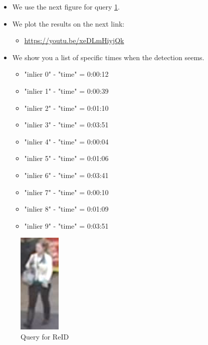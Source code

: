 \documentclass[a4paper]{article}
\begin{document}
\begin{itemize}

\item We use the next figure for query \ref{fig:query_id_92}.
\item  We plot the results on the next link: 
\begin{itemize}
    \item \href{https://youtu.be/xeDLmHiyjQk}{https://youtu.be/xeDLmHiyjQk}
\end{itemize}
\item  We show you a list of specific times when the detection seems.
    \begin{itemize}
        \item "inlier 0" - "time" = 0:00:12
        \item "inlier 1" - "time" = 0:00:39
        \item "inlier 2" - "time" = 0:01:10
        \item "inlier 3" - "time" = 0:03:51
        \item "inlier 4" - "time" = 0:00:04
        \item "inlier 5" - "time" = 0:01:06
        \item "inlier 6" - "time" = 0:03:41
        \item "inlier 7" - "time" = 0:00:10
        \item "inlier 8" - "time" = 0:01:09
        \item "inlier 9" - "time" = 0:03:51
    \end{itemize}

\end{itemize}

\begin{figure}[ht]
    \centering
    \includegraphics[width=2cm]{imgs/query_id_92.png}
    \caption[query test]{Query for ReID}
    \label{fig:query_id_92}
\end{figure}\leavevmode\newline
\end{document}
